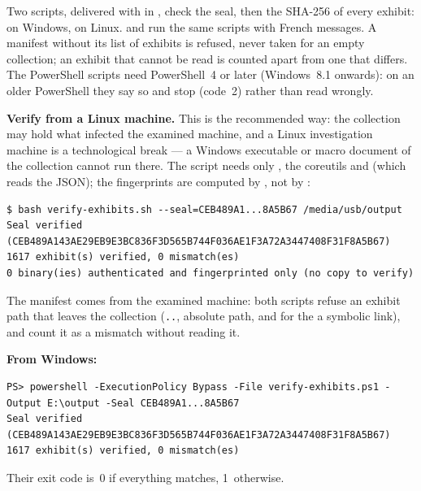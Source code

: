 \documentclass[11pt,a4paper,oneside]{report}
\begin{document}
Two scripts, delivered with  in , check the
seal, then the SHA-256 of every exhibit:  on
Windows,  on Linux. 
and  run the same scripts with French
messages. A manifest without its list of exhibits is refused, never taken
for an empty collection; an exhibit that cannot be read is counted apart from
one that differs. The PowerShell scripts need PowerShell~4 or
later (Windows~8.1 onwards): on an older PowerShell they say so and stop
(code~2) rather than read wrongly.

\textbf{Verify from a Linux machine.} This is the recommended way: the
collection may hold what infected the examined machine, and a Linux
investigation machine is a technological break — a Windows executable or macro
document of the collection cannot run there. The script needs only
, the coreutils and  (which reads the JSON);
the fingerprints are computed by , not by \wac{}:

\begin{lstlisting}
$ bash verify-exhibits.sh --seal=CEB489A1...8A5B67 /media/usb/output
Seal verified (CEB489A143AE29EB9E3BC836F3D565B744F036AE1F3A72A3447408F31F8A5B67)
1617 exhibit(s) verified, 0 mismatch(es)
0 binary(ies) authenticated and fingerprinted only (no copy to verify)
\end{lstlisting}

The manifest comes from the examined machine: both scripts refuse an exhibit
path that leaves the collection (\texttt{..}, absolute path, and for the
 a symbolic link), and count it as a mismatch without reading it.

\textbf{From Windows:}

\begin{lstlisting}
PS> powershell -ExecutionPolicy Bypass -File verify-exhibits.ps1 -Output E:\output -Seal CEB489A1...8A5B67
Seal verified (CEB489A143AE29EB9E3BC836F3D565B744F036AE1F3A72A3447408F31F8A5B67)
1617 exhibit(s) verified, 0 mismatch(es)
\end{lstlisting}

Their exit code is~0 if everything matches, 1~otherwise.




\end{document}
